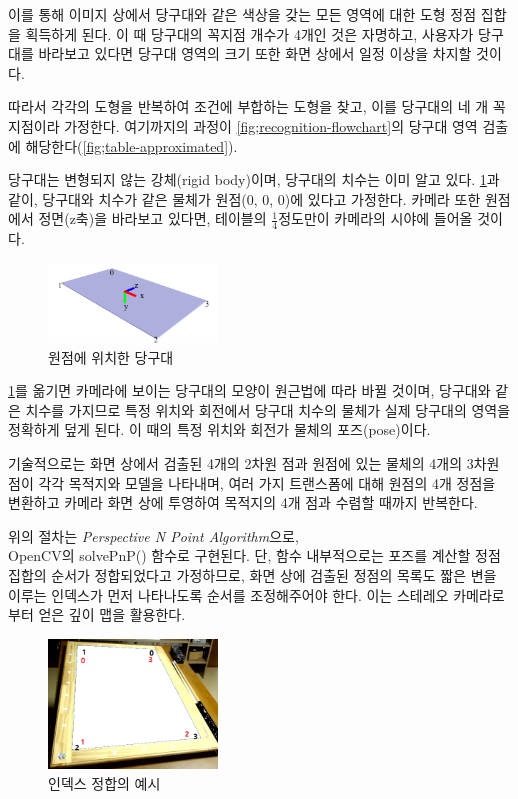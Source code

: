 \documentclass[10pt]{oblivoir}
\begin{document}
이를 통해 이미지 상에서 당구대와 같은 색상을 갖는 모든 영역에 대한 도형 정점 집합을 획득하게 된다. 이 때 당구대의 꼭지점 개수가 4개인 것은 자명하고, 사용자가 당구대를 바라보고 있다면 당구대 영역의 크기 또한 화면 상에서 일정 이상을 차지할 것이다.

따라서 각각의 도형을 반복하여 조건에 부합하는 도형을 찾고, 이를 당구대의 네 개 꼭지점이라 가정한다. 여기까지의 과정이 \cref{fig;recognition-flowchart}의 당구대 영역 검출에 해당한다(\cref{fig;table-approximated}).

당구대는 변형되지 않는 강체(rigid body)이며, 당구대의 치수는 이미 알고 있다. \cref{fig;table-on-origin}과 같이, 당구대와 치수가 같은 물체가 원점(0, 0, 0)에 있다고 가정한다. 카메라 또한 원점에서 정면(z축)을 바라보고 있다면, 테이블의 $\frac{1}{4}$정도만이 카메라의 시야에 들어올 것이다.

\begin{figure}
    \centering
    \includegraphics[width=0.4\textwidth]{img/table-3d.pdf}
    \caption{원점에 위치한 당구대}
    \label{fig;table-on-origin}
\end{figure}

\cref{fig;table-on-origin}를 옮기면 카메라에 보이는 당구대의 모양이 원근법에 따라 바뀔 것이며, 당구대와 같은 치수를 가지므로 특정 위치와 회전에서 당구대 치수의 물체가 실제 당구대의 영역을 정확하게 덮게 된다. 이 때의 특정 위치와 회전가 물체의 포즈(pose)이다.

기술적으로는 화면 상에서 검출된 4개의 2차원 점과 원점에 있는 물체의 4개의 3차원 점이 각각 목적지와 모델을 나타내며, 여러 가지 트랜스폼에 대해 원점의 4개 정점을 변환하고 카메라 화면 상에 투영하여 목적지의 4개 점과 수렴할 때까지 반복한다.

위의 절차는 \textit{Perspective N Point Algorithm}으로, \\OpenCV의 solvePnP() 함수로 구현된다. 단, 함수 내부적으로는 포즈를 계산할 정점 집합의 순서가 정합되었다고 가정하므로, 화면 상에 검출된 정점의 목록도 짧은 변을 이루는 인덱스가 먼저 나타나도록 순서를 조정해주어야 한다. 이는 스테레오 카메라로부터 얻은 깊이 맵을 활용한다.

\begin{figure}
    \centering
    \includegraphics[width=0.4\textwidth]{img/billiards-table-indexes.png}
    \caption{인덱스 정합의 예시}
\end{figure}
\end{document}
